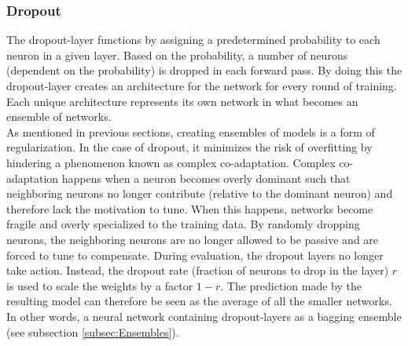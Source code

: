 \subsubsection*{Dropout}\label{subsubsec:Dropout}
The dropout-layer functions by assigning a predetermined probability to each neuron in a given layer. Based on the 
probability, a number of neurons (dependent on the probability) is dropped in each forward pass. By doing this the 
dropout-layer creates an architecture for the network for every round of training. Each unique architecture represents 
its own network in what becomes an ensemble of networks. 
\\
As mentioned in previous sections, creating ensembles of models is a form of regularization. In the case of 
dropout, it minimizes the risk of overfitting by hindering a phenomenon known as complex co-adaptation. Complex
co-adaptation happens when a neuron becomes overly dominant such that neighboring neurons no longer contribute (relative
to the dominant neuron) and therefore lack the motivation to tune. When this happens, networks become fragile and overly 
specialized to the training data. By randomly dropping neurons, the neighboring neurons are no longer allowed to be passive 
and are forced to tune to compensate. During evaluation, the dropout layers no longer take action. Instead, the dropout rate 
(fraction of neurons to drop in the layer) $r$ is used to scale the weights by a factor $1-r$. The prediction made by the resulting 
model can therefore be seen as the average of all the smaller networks. In other words, a neural network containing dropout-layers 
as a bagging ensemble (see subsection \ref{subsec:Ensembles}). 

